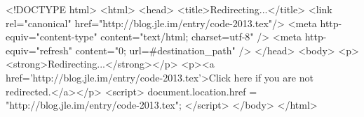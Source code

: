<!DOCTYPE html>
<html>
<head>
<title>Redirecting...</title>
<link rel="canonical" href="http://blog.jle.im/entry/code-2013.tex"/>
<meta http-equiv="content-type" content="text/html; charset=utf-8" />
<meta http-equiv="refresh" content="0; url=#{destination_path}" />
</head>
<body>
  <p><strong>Redirecting...</strong></p>
  <p><a href='http://blog.jle.im/entry/code-2013.tex'>Click here if you are not redirected.</a></p>
  <script>
    document.location.href = "http://blog.jle.im/entry/code-2013.tex";
  </script>
</body>
</html>

